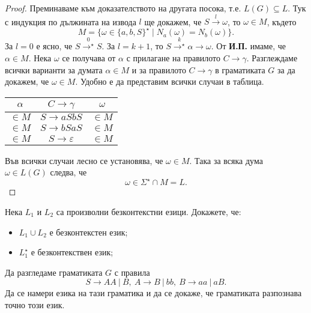 \begin{proof}
  Преминаваме към доказателството на другата посока, т.е. $L(G) \subseteq L$.
  Тук с индукция по дължината на извода $l$ ще докажем, че
  $S \stackrel{l}{\rightarrow} \omega$, то $\omega \in M$,
  където
  \[M = \{\omega \in \{a,b,S\}^\star \mid N_a(\omega) = N_b(\omega)\}.\]
  За $l = 0$  е ясно, че $S \stackrel{0}{\rightarrow^\star} S$.
  За $l = k+1$, то $S \stackrel{k}{\rightarrow^\star} \alpha \rightarrow \omega$.
  От {\bf И.П.} имаме, че $\alpha \in M$.
  Нека $\omega$ се получава от $\alpha$ с прилагане на правилото $C \rightarrow \gamma$.
  Разглеждаме всички варианти за думата $\alpha \in M$ и за правилото $C\rightarrow \gamma$ в граматиката $G$
  за да докажем, че  $\omega \in M$.
  Удобно е да представим всички случаи в таблица.
  \begin{center}
    \begin{tabular}{| c | c | c |}
      \hline
      $\alpha$ & $C \rightarrow \gamma$ & $\omega$ \\ \hline
      $\in M$ & $S \rightarrow aSbS$ & $\in M$ \\ \hline
      $\in M$ & $S \rightarrow bSaS$ & $\in M$ \\ \hline
      $\in M$ & $S \rightarrow \varepsilon$ & $\in M$ \\ \hline
    \end{tabular}
  \end{center}
  Във всички случаи лесно се установява, че $\omega \in M$.
  Така за всяка дума $\omega \in L(G)$ следва, че
  \[\omega \in \Sigma^\star \cap M = L.\]
\end{proof}

\begin{problem}
  Нека $L_1$ и $L_2$ са произволни безконтекстни езици.
  Докажете, че:
  \begin{itemize}
  \item 
    $L_1 \cup L_2$ е безконтекстен език;
  \item
    $L^\star_1$ е безконтекствен език;
  \end{itemize}
\end{problem}

\begin{problem}
  Да разгледаме граматиката $G$ с правила
  \[S \to AA\ |\ B,\ A \to B\ |\ bb,\ B \to aa\ |\ aB.\]
  Да се намери езика на тази граматика и да се докаже, че граматиката разпознава точно този език.
\end{problem}



